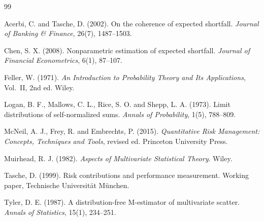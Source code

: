 \documentclass[11pt]{article}
\theoremstyle{remark}
\begin{document}

\begin{thebibliography}{99}

Acerbi, C. and Tasche, D. (2002). On the coherence of expected shortfall. \emph{Journal of Banking \& Finance},
26(7), 1487--1503.

Chen, S. X. (2008). Nonparametric estimation of expected shortfall. \emph{Journal of Financial Econometrics},
6(1), 87--107.

Feller, W. (1971). \emph{An Introduction to Probability Theory and Its Applications}, Vol.~II, 2nd ed. Wiley.

Logan, B. F., Mallows, C. L., Rice, S. O. and Shepp, L. A. (1973). Limit distributions of self-normalized sums.
\emph{Annals of Probability}, 1(5), 788--809.

McNeil, A. J., Frey, R. and Embrechts, P. (2015). \emph{Quantitative Risk Management: Concepts, Techniques and
Tools}, revised ed. Princeton University Press.

Muirhead, R. J. (1982). \emph{Aspects of Multivariate Statistical Theory}. Wiley.

Tasche, D. (1999). Risk contributions and performance measurement. Working paper, Technische Universit\"at
M\"unchen.

Tyler, D. E. (1987). A distribution-free M-estimator of multivariate scatter. \emph{Annals of Statistics},
15(1), 234--251.

\end{thebibliography}
\end{document}
